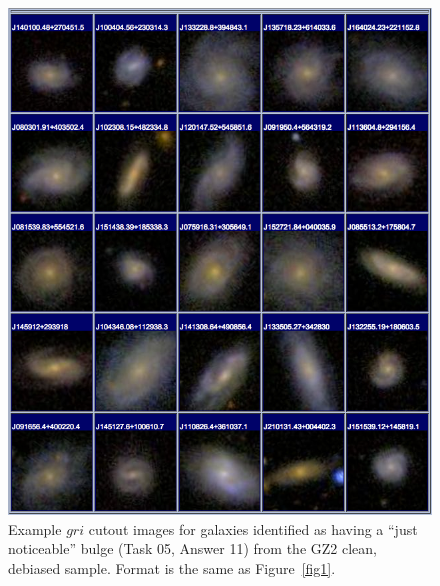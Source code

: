 \documentclass[useAMS,usenatbib]{mn2e}
\begin{document}
\newpage
\clearpage
\begin{figure}
\includegraphics[angle=0,width=7.0in]{figures/gallery/justnoticeable.png}
\caption{Example $gri$ cutout images for galaxies identified as having a ``just noticeable'' bulge (Task 05, Answer 11) from the GZ2 clean, debiased sample. Format is the same as Figure~\ref{fig1}.}
\end{figure}
\end{document}
